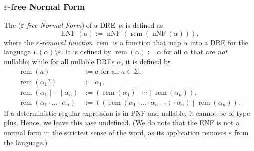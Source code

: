 \documentclass[a4paper,11pt, svgnames,titlepage]{article}
\newcommand{\rxo}{\mathtt{?}}
\newcommand{\rxc}{\cdot}
\DeclareMathOperator{\ror}{\mathtt{|}}
\newcommand{\emptyword}{\varepsilon}
\newcommand{\df}{:=}
\DeclareMathOperator{\remfun}{rem}
\DeclareMathOperator{\enf}{ENF}
\DeclareMathOperator{\nnf}{nNF}
\begin{document}
\subsubsection{$\emptyword$-free Normal Form}
The (\emph{$\emptyword$-free Normal Form}) of a DRE~$\alpha$  is defined as 
$$\enf(\alpha)\df\nnf(\remfun(\nnf(\alpha))),$$
where the  \emph{$\emptyword$-removal function} $\remfun$ is a function that map $\alpha$ into a DRE for the language $L(\alpha)\setminus\emptyword$. It is defined by $\remfun(\alpha)\df\alpha$ for all $\alpha$ that are \emph{not} nullable; while for all nullable DREs $\alpha$, it is defined by
\begin{align*}
	\remfun(a)&\df a\text{ for all }a\in \Sigma,\\
	\remfun(\alpha_1\rxo)&\df \alpha_1,\\
	\remfun(\alpha_1\ror \cdots\ror \alpha_n)&\df (\remfun(\alpha_1)\ror \cdots\ror \remfun(\alpha_n)),\\
	\remfun(\alpha_1\rxc \ldots\rxc \alpha_n)&\df ((\remfun(\alpha_1\rxc \ldots\rxc\alpha_{n-1})\rxc\alpha_n)\ror \remfun(\alpha_n)).
\end{align*}
If a deterministic regular expression is in PNF and nullable, it cannot be of type plus. Hence, we leave this case undefined. (We do note that the ENF is not a normal form in the strictest sense of the word, as its application removes $\emptyword$ from the language.) 
\end{document}
